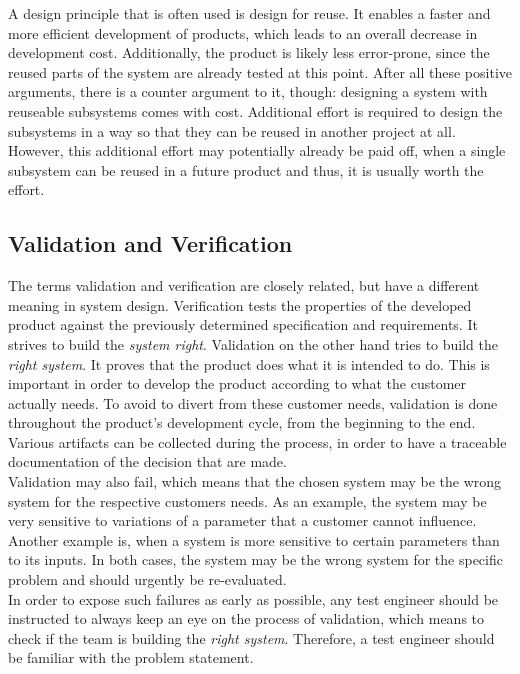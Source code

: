 A design principle that is often used is design for reuse.
It enables a faster and more efficient development of products, which leads to an overall decrease in development cost.
Additionally, the product is likely less error-prone, since the reused parts of the system are already tested at this point.
After all these positive arguments, there is a counter argument to it, though: designing a system with reuseable subsystems comes with cost.
Additional effort is required to design the subsystems in a way so that they can be reused in another project at all.
However, this additional effort may potentially already be paid off, when a single subsystem can be reused in a future product and thus, it is usually worth the effort.

\subsection{Validation and Verification}
\label{sec:ValidationAndVerification}

The terms validation and verification are closely related, but have a different meaning in system design.
Verification tests the properties of the developed product against the previously determined specification and requirements.
It strives to build the \textit{system right}.
Validation on the other hand tries to build the \textit{right system}.
It proves that the product does what it is intended to do.
This is important in order to develop the product according to what the customer actually needs.
To avoid to divert from these customer needs, validation is done throughout the product's development cycle, from the beginning to the end.
Various artifacts can be collected during the process, in order to have a traceable documentation of the decision that are made.\\

Validation may also fail, which means that the chosen system may be the wrong system for the respective customers needs.
As an example, the system may be very sensitive to variations of a parameter that a customer cannot influence.
Another example is, when a system is more sensitive to certain parameters than to its inputs.
In both cases, the system may be the wrong system for the specific problem and should urgently be re-evaluated.\\

In order to expose such failures as early as possible, any test engineer should be instructed to always keep an eye on the process of validation, which means to check if the team is building the \textit{right system}.
Therefore, a test engineer should be familiar with the problem statement.

